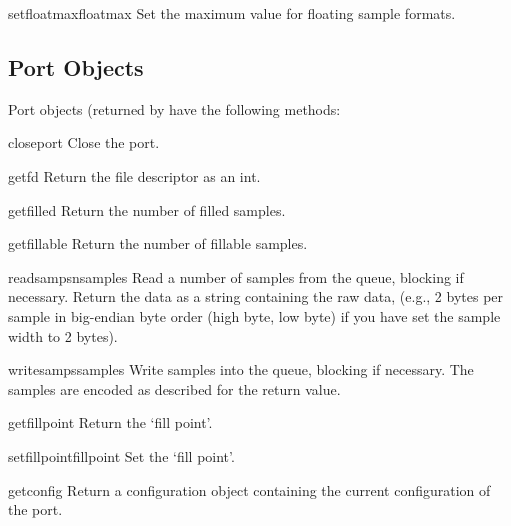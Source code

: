 \begin{funcdesc}{setfloatmax}{floatmax}
Set the maximum value for floating sample formats.
\end{funcdesc}

\subsection{Port Objects}

Port objects (returned by  have the following
methods:


\begin{funcdesc}{closeport}{}
Close the port.
\end{funcdesc}

\begin{funcdesc}{getfd}{}
Return the file descriptor as an int.
\end{funcdesc}

\begin{funcdesc}{getfilled}{}
Return the number of filled samples.
\end{funcdesc}

\begin{funcdesc}{getfillable}{}
Return the number of fillable samples.
\end{funcdesc}

\begin{funcdesc}{readsamps}{nsamples}
Read a number of samples from the queue, blocking if necessary.
Return the data as a string containing the raw data, (e.g., 2 bytes per
sample in big-endian byte order (high byte, low byte) if you have set
the sample width to 2 bytes).
\end{funcdesc}

\begin{funcdesc}{writesamps}{samples}
Write samples into the queue, blocking if necessary.  The samples are
encoded as described for the  return value.
\end{funcdesc}

\begin{funcdesc}{getfillpoint}{}
Return the `fill point'.
\end{funcdesc}

\begin{funcdesc}{setfillpoint}{fillpoint}
Set the `fill point'.
\end{funcdesc}

\begin{funcdesc}{getconfig}{}
Return a configuration object containing the current configuration of
the port.
\end{funcdesc}

